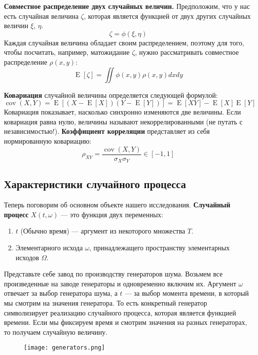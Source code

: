 \documentclass[12pt, a4paper]{article}
\DeclareMathOperator{\E}{E}
\DeclareMathOperator{\cov}{cov}
\begin{document}
\textbf{Совместное распределение двух случайных величин.} Предположим, что у нас есть случайная величина $\zeta$, которая является функцией от двух других случайных величин $\xi$, $\eta$.
\[
\zeta = \phi(\xi, \eta)
\]
Каждая случайная величина обладает своим распределением, поэтому для того, чтобы посчитать, например, матожидание $\zeta$, нужно рассматривать совместное распределение $\rho(x, y)$:
\[
\E[\zeta] = \iint \phi(x, y)\rho(x, y)dxdy
\]

\textbf{Ковариация} случайной величины определяется следующей формулой:
\[
\cov(X, Y) = \E[(X - \E[X])(Y - \E[Y])] = \E[XY] - \E[X]\E[Y]
\]
Ковариация показывает, насколько синхронно изменяются две величины. Если ковариация равна нулю, величины называют некоррелированными (не путать с независимостью!). \textbf{Коэффициент корреляции} представляет из себя нормированную ковариацию:
\[
\rho_{XY} = \frac{\cov(X,Y)}{\sigma_X\sigma_Y} \in [-1, 1]
\]

\subsection*{Характеристики случайного процесса}

Теперь поговорим об основном объекте нашего исследования. \textbf{Случайный процесс} $X(t, \omega)$ — это функция двух переменных:
\begin{enumerate}
    \item $t$ (Обычно время) — аргумент из некоторого множества $T$.
    \item Элементарного исхода $\omega$, принадлежащего пространству элементарных исходов $\Omega$.
\end{enumerate}

Представьте себе завод по производству генераторов шума. Возьмем все произведенные на заводе генераторы и одновременно включим их. Аргумент $\omega$ отвечает за выбор генератора шума, а $t$ — за выбор момента времени, в который мы смотрим на значения генератора. То есть конкретный генератор символизирует реализацию случайного процесса, которая является функцией времени. Если мы фиксируем время и смотрим значения на разных генераторах, то получаем случайную величину.

\begin{figure}[h!]
    \centering
    \texttt{[image: generators.png]}
\end{figure}
\end{document}
